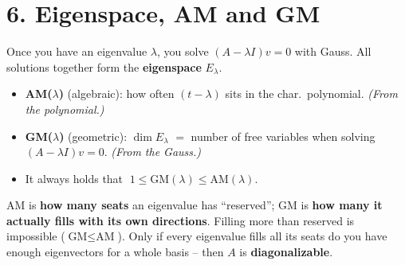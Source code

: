 \documentclass[a4paper,12pt]{article}
\begin{document}
\section*{6. Eigenspace, AM and GM}

Once you have an eigenvalue $\lambda$, you solve $(A - \lambda I)v = 0$ with Gauss. All solutions together form the \textbf{eigenspace} $E_\lambda$.

\begin{merkbox}[title={Two multiplicities -- don't mix them up!}]
\begin{itemize}[leftmargin=*, nosep]
    \item \textbf{AM($\lambda$)} (algebraic): how often $(t - \lambda)$ sits in the char.\ polynomial. \emph{(From the polynomial.)}
    \item \textbf{GM($\lambda$)} (geometric): $\dim E_\lambda$ $=$ number of free variables when solving $(A - \lambda I)v = 0$. \emph{(From the Gauss.)}
    \item It always holds that $\;1 \le \text{GM}(\lambda) \le \text{AM}(\lambda)$.
\end{itemize}
\end{merkbox}

\begin{center}
\end{center}

\begin{analogie}
AM is \textbf{how many seats} an eigenvalue has ``reserved''; GM is \textbf{how many it actually fills with its own directions}. Filling more than reserved is impossible ($\text{GM} \le \text{AM}$). Only if every eigenvalue fills all its seats do you have enough eigenvectors for a whole basis -- then $A$ is \textbf{diagonalizable}.
\end{analogie}
\end{document}
